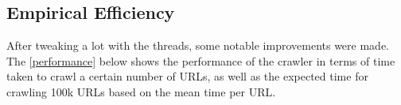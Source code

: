 
\subsection{Empirical Efficiency}

After tweaking a lot with the threads, some notable improvements were made. The \autoref{performance} below shows the performance of the crawler in terms of time taken to crawl a certain number of URLs, as well as the expected time for crawling 100k URLs based on the mean time per URL.

